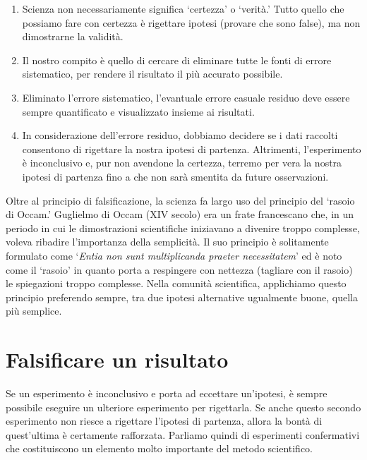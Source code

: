 \documentclass[a4paper,12pt,oneside]{book}
\providecommand{\tightlist}{%
  \setlength{\itemsep}{0pt}\setlength{\parskip}{0pt}}
\begin{document}
\begin{enumerate}
\def\labelenumi{\arabic{enumi}.}
\tightlist
\item
  Scienza non necessariamente significa `certezza' o `verità.' Tutto quello che possiamo fare con certezza è rigettare ipotesi (provare che sono false), ma non dimostrarne la validità.
\item
  Il nostro compito è quello di cercare di eliminare tutte le fonti di errore sistematico, per rendere il risultato il più accurato possibile.
\item
  Eliminato l'errore sistematico, l'evantuale errore casuale residuo deve essere sempre quantificato e visualizzato insieme ai risultati.
\item
  In considerazione dell'errore residuo, dobbiamo decidere se i dati raccolti consentono di rigettare la nostra ipotesi di partenza. Altrimenti, l'esperimento è inconclusivo e, pur non avendone la certezza, terremo per vera la nostra ipotesi di partenza fino a che non sarà smentita da future osservazioni.
\end{enumerate}

Oltre al principio di falsificazione, la scienza fa largo uso del principio del `rasoio di Occam.' Guglielmo di Occam (XIV secolo) era un frate francescano che, in un periodo in cui le dimostrazioni scientifiche iniziavano a divenire troppo complesse, voleva ribadire l'importanza della semplicità. Il suo principio è solitamente formulato come `\emph{Entia non sunt multiplicanda praeter necessitatem}' ed è noto come il `rasoio' in quanto porta a respingere con nettezza (tagliare con il rasoio) le spiegazioni troppo complesse. Nella comunità scientifica, applichiamo questo principio preferendo sempre, tra due ipotesi alternative ugualmente buone, quella più semplice.

\hypertarget{falsificare-un-risultato}{%
\section{Falsificare un risultato}\label{falsificare-un-risultato}}

Se un esperimento è inconclusivo e porta ad eccettare un'ipotesi, è sempre possibile eseguire un ulteriore esperimento per rigettarla. Se anche questo secondo esperimento non riesce a rigettare l'ipotesi di partenza, allora la bontà di quest'ultima è certamente rafforzata. Parliamo quindi di esperimenti confermativi che costituiscono un elemento molto importante del metodo scientifico.
\end{document}

